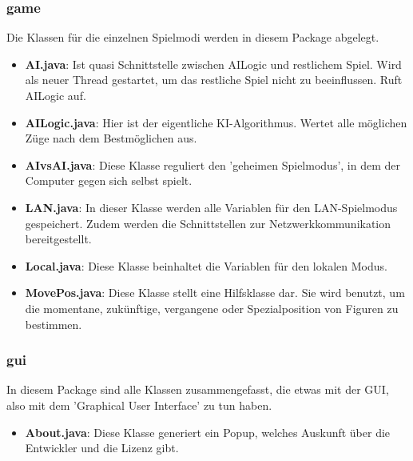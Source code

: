 \documentclass[12pt,a4paper]{article}
\begin{document}
{\begin{itemize}
\end{itemize}
 
\subsubsection{game}

Die Klassen für die einzelnen Spielmodi werden in diesem Package abgelegt. 


\begin{itemize}

	\item{\textbf{AI.java}: Ist quasi Schnittstelle zwischen AILogic und restlichem Spiel. Wird als neuer Thread gestartet, um das restliche Spiel nicht zu beeinflussen. Ruft AILogic auf.}
	
	\item{\textbf{AILogic.java}: Hier ist der eigentliche KI-Algorithmus. Wertet alle möglichen Züge nach dem Bestmöglichen aus.}

	\item{\textbf{AIvsAI.java}: Diese Klasse reguliert den 'geheimen Spielmodus', in dem der Computer gegen sich selbst spielt. }
	
	\item{\textbf{LAN.java}: In dieser Klasse werden alle Variablen für den LAN-Spielmodus gespeichert. Zudem werden die Schnittstellen zur Netzwerkkommunikation bereitgestellt.}
	
	\item{\textbf{Local.java}: Diese Klasse beinhaltet die Variablen für den lokalen Modus. }

	\item{\textbf{MovePos.java}: Diese Klasse stellt eine Hilfsklasse dar. Sie wird benutzt, um die momentane, zukünftige, vergangene oder Spezialposition von Figuren zu bestimmen.}

\end{itemize}

\subsubsection{gui}

In diesem Package sind alle Klassen zusammengefasst, die etwas mit der GUI, also mit dem 'Graphical User Interface' zu tun haben. 

\begin{itemize}

	\item{\textbf{About.java}: Diese Klasse generiert ein Popup, welches Auskunft über die Entwickler und die Lizenz gibt. }
	

\end{itemize}}
\end{document}
